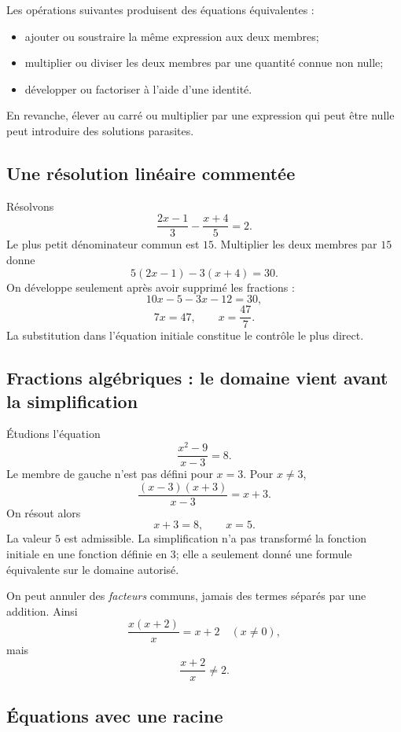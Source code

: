 \documentclass[12pt,a4paper,openany]{book}
\begin{document}
Les opérations suivantes produisent des équations équivalentes :
\begin{itemize}
\item ajouter ou soustraire la même expression aux deux membres;
\item multiplier ou diviser les deux membres par une quantité connue non nulle;
\item développer ou factoriser à l'aide d'une identité.
\end{itemize}

En revanche, élever au carré ou multiplier par une expression qui peut être nulle peut introduire des solutions parasites.

\subsection{Une résolution linéaire commentée}

Résolvons
\[
\frac{2x-1}{3}-\frac{x+4}{5}=2.
\]
Le plus petit dénominateur commun est $15$. Multiplier les deux membres par $15$ donne
\[
5(2x-1)-3(x+4)=30.
\]
On développe seulement après avoir supprimé les fractions :
\[
10x-5-3x-12=30,
\]
\[
7x=47,
\qquad
x=\frac{47}{7}.
\]
La substitution dans l'équation initiale constitue le contrôle le plus direct.

\subsection{Fractions algébriques : le domaine vient avant la simplification}

Étudions l'équation
\[
\frac{x^2-9}{x-3}=8.
\]
Le membre de gauche n'est pas défini pour $x=3$. Pour $x\neq3$,
\[
\frac{(x-3)(x+3)}{x-3}=x+3.
\]
On résout alors
\[
x+3=8,
\qquad x=5.
\]
La valeur $5$ est admissible. La simplification n'a pas transformé la fonction initiale en une fonction définie en $3$; elle a seulement donné une formule équivalente sur le domaine autorisé.

\begin{warningbox}
On peut annuler des \emph{facteurs} communs, jamais des termes séparés par une addition. Ainsi
\[
\frac{x(x+2)}{x}=x+2\quad(x\neq0),
\]
mais
\[
\frac{x+2}{x}\neq2.
\]
\end{warningbox}

\subsection{Équations avec une racine}
\end{document}
